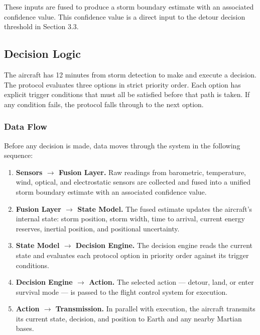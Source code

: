 \documentclass[a4paper,12pt]{article}
\begin{document}
These inputs are fused to produce a storm boundary estimate with an associated confidence value.
This confidence value is a direct input to the detour decision threshold in Section 3.3.

\subsection{Decision Logic}
The aircraft has 12 minutes from storm detection to make and execute a decision. The protocol
evaluates three options in strict priority order. Each option has explicit trigger conditions
that must all be satisfied before that path is taken. If any condition fails, the protocol
falls through to the next option.

\subsubsection*{Data Flow}
Before any decision is made, data moves through the system in the following sequence:

\begin{enumerate}[itemsep=0.3em]
    \item \textbf{Sensors $\rightarrow$ Fusion Layer.} Raw readings from barometric, temperature,
    wind, optical, and electrostatic sensors are collected and fused into a unified storm
    boundary estimate with an associated confidence value.

    \item \textbf{Fusion Layer $\rightarrow$ State Model.} The fused estimate updates the
    aircraft's internal state: storm position, storm width, time to arrival, current energy
    reserves, inertial position, and positional uncertainty.

    \item \textbf{State Model $\rightarrow$ Decision Engine.} The decision engine reads the
    current state and evaluates each protocol option in priority order against its trigger
    conditions.

    \item \textbf{Decision Engine $\rightarrow$ Action.} The selected action — detour, land,
    or enter survival mode — is passed to the flight control system for execution.

    \item \textbf{Action $\rightarrow$ Transmission.} In parallel with execution, the aircraft
    transmits its current state, decision, and position to Earth and any nearby Martian bases.
\end{enumerate}
\end{document}
